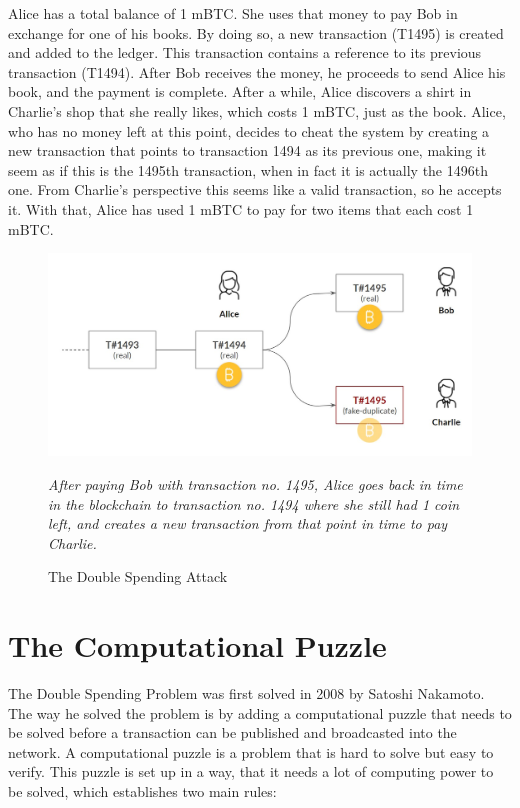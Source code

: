 \documentclass[a4paper, 12pt]{report}
\begin{document}
\par Alice has a total balance of 1 mBTC. She uses that money to pay Bob in exchange for one of his books. By doing so, a new transaction (T1495) is created and added to the ledger. This transaction contains a reference to its previous transaction (T1494). After Bob receives the money, he proceeds to send Alice his book, and the payment is complete. After a while, Alice discovers a shirt in Charlie’s shop that she really likes, which costs 1 mBTC, just as the book. Alice, who has no money left at this point, decides to cheat the system by creating a new transaction that points to transaction 1494 as its previous one, making it seem as if this is the 1495th transaction, when in fact it is actually the 1496th one. From Charlie’s perspective this seems like a valid transaction, so he accepts it. With that, Alice has used 1 mBTC to pay for two items that each cost 1 mBTC.

\begin{figure}[h]
	\includegraphics[width=\textwidth]{03_Double_Spend}
	\caption{The Double Spending Attack}
	\medskip
	\small \textit{After paying Bob with transaction no. 1495, Alice goes back in time in the blockchain to transaction no. 1494 where she still had 1 coin left, and creates a new transaction from that point in time to pay Charlie.}
	\label{fig:03_Double_Spend}
\end{figure}

\section{The Computational Puzzle}\label{chap:The_Computational_Puzzle}

\par The Double Spending Problem was first solved in 2008 by Satoshi Nakamoto. The way he solved the problem is by adding a computational puzzle that needs to be solved before a transaction can be published and broadcasted into the network. A computational puzzle is a problem that is hard to solve but easy to verify. This puzzle is set up in a way, that it needs a lot of computing power to be solved, which establishes two main rules:
\end{document}
